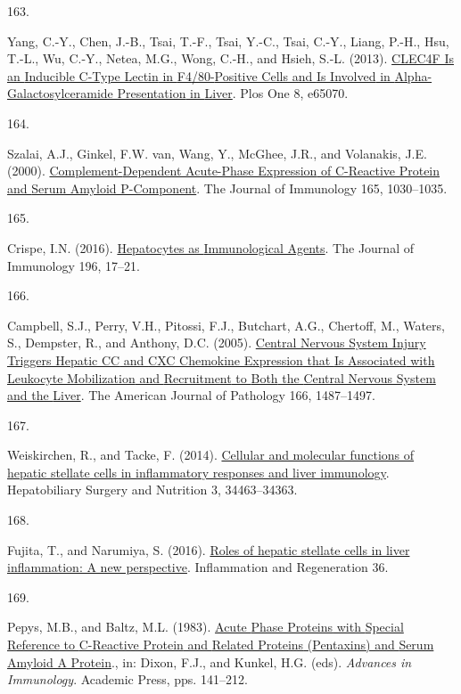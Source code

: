 \documentclass[
]{article}
\newlength{\cslhangindent}
\newlength{\csllabelwidth}
\newlength{\cslentryspacingunit} %
\newenvironment{CSLReferences}[2] %
 {%
  \setlength{\parindent}{0pt}
  \ifodd #1
  \let\oldpar\par
  \def\par{\hangindent=\cslhangindent\oldpar}
  \fi
  \setlength{\parskip}{#2\cslentryspacingunit}
 }%
 {}
\newcommand{\CSLLeftMargin}[1]{\parbox[t]{\csllabelwidth}{#1}}
\newcommand{\CSLRightInline}[1]{\parbox[t]{\linewidth - \csllabelwidth}{#1}\break}
\begin{document}
\begin{CSLReferences}{0}{0}
\leavevmode{}%
\CSLLeftMargin{163. }
\CSLRightInline{Yang, C.-Y., Chen, J.-B., Tsai, T.-F., Tsai, Y.-C., Tsai, C.-Y., Liang, P.-H., Hsu, T.-L., Wu, C.-Y., Netea, M.G., Wong, C.-H., and Hsieh, S.-L. (2013). \href{https://doi.org/10.1371/journal.pone.0065070}{{CLEC4F Is} an {Inducible C-Type Lectin} in {F4}/80-{Positive Cells} and {Is Involved} in {Alpha-Galactosylceramide Presentation} in {Liver}}. Plos One 8, e65070.}

\leavevmode{}%
\CSLLeftMargin{164. }
\CSLRightInline{Szalai, A.J., Ginkel, F.W. van, Wang, Y., McGhee, J.R., and Volanakis, J.E. (2000). \href{https://doi.org/10.4049/jimmunol.165.2.1030}{Complement-{Dependent Acute-Phase Expression} of {C-Reactive Protein} and {Serum Amyloid P-Component}}. The Journal of Immunology 165, 1030--1035.}

\leavevmode{}%
\CSLLeftMargin{165. }
\CSLRightInline{Crispe, I.N. (2016). \href{https://doi.org/10.4049/jimmunol.1501668}{Hepatocytes as {Immunological Agents}}. The Journal of Immunology 196, 17--21.}

\leavevmode{}%
\CSLLeftMargin{166. }
\CSLRightInline{Campbell, S.J., Perry, V.H., Pitossi, F.J., Butchart, A.G., Chertoff, M., Waters, S., Dempster, R., and Anthony, D.C. (2005). \href{https://doi.org/10.1016/S0002-9440(10)62365-6}{Central {Nervous System Injury Triggers Hepatic CC} and {CXC Chemokine Expression} that {Is Associated} with {Leukocyte Mobilization} and {Recruitment} to {Both} the {Central Nervous System} and the {Liver}}. The American Journal of Pathology 166, 1487--1497.}

\leavevmode{}%
\CSLLeftMargin{167. }
\CSLRightInline{Weiskirchen, R., and Tacke, F. (2014). \href{https://doi.org/10.3978/j.issn.2304-3881.2014.11.03}{Cellular and molecular functions of hepatic stellate cells in inflammatory responses and liver immunology}. Hepatobiliary Surgery and Nutrition 3, 34463--34363.}

\leavevmode{}%
\CSLLeftMargin{168. }
\CSLRightInline{Fujita, T., and Narumiya, S. (2016). \href{https://doi.org/10.1186/s41232-016-0005-6}{Roles of hepatic stellate cells in liver inflammation: A new perspective}. Inflammation and Regeneration 36.}

\leavevmode{}%
\CSLLeftMargin{169. }
\CSLRightInline{Pepys, M.B., and Baltz, M.L. (1983). \href{https://doi.org/10.1016/S0065-2776(08)60379-X}{Acute {Phase Proteins} with {Special Reference} to {C-Reactive Protein} and {Related Proteins} ({Pentaxins}) and {Serum Amyloid A Protein}}., in: Dixon, F.J., and Kunkel, H.G. (eds). \emph{Advances in {Immunology}}. {Academic Press}, pps. 141--212.}


\end{CSLReferences}
\end{document}
